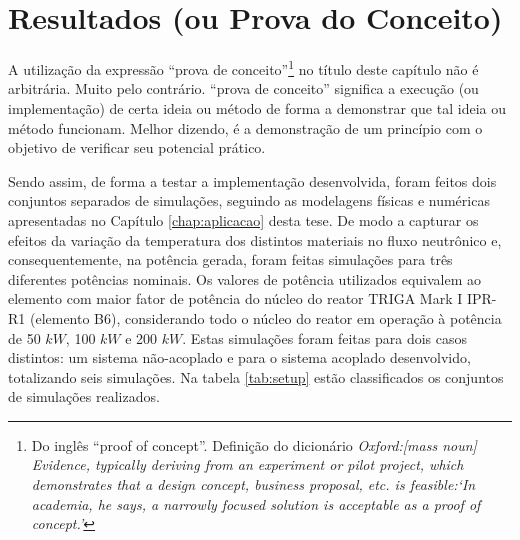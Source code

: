 \chapter{Resultados (ou Prova do Conceito)}
\label{chap:resultados}


A utilização da expressão ``prova de conceito''\footnote{Do inglês ``proof of concept''. Definição do dicionário
  \textit{Oxford:[mass noun] Evidence, typically deriving from an experiment or pilot project, which demonstrates that a design concept,
    business proposal, etc. is feasible:‘In academia, he says, a narrowly focused solution is acceptable as a proof of concept.’}}
no título deste capítulo não é arbitrária.
Muito pelo contrário. ``prova de conceito'' significa a execução (ou implementação) de
certa ideia ou método de forma a demonstrar que tal ideia ou método funcionam. Melhor dizendo,
é a demonstração de um princípio com o objetivo de verificar seu potencial prático.

Sendo assim, de forma a testar a implementação desenvolvida, foram feitos dois conjuntos
separados de simulações, seguindo as modelagens físicas e numéricas apresentadas no Capítulo \ref{chap:aplicacao}
desta tese. De modo a capturar os efeitos da variação da temperatura dos distintos materiais
no fluxo neutrônico e, consequentemente, na potência gerada, foram feitas simulações
para três diferentes potências nominais. Os valores de potência utilizados equivalem ao elemento
com maior fator de potência \cite{Veloso2005} do núcleo do reator TRIGA Mark I IPR-R1 (elemento B6),
considerando todo o núcleo do reator em operação à potência de 50 $kW$, 100 $kW$ e 200 $kW$.
Estas simulações foram feitas para dois casos
distintos: um sistema não-acoplado e para o sistema acoplado desenvolvido, totalizando seis
simulações. Na tabela
\ref{tab:setup} estão classificados os conjuntos de simulações realizados.

